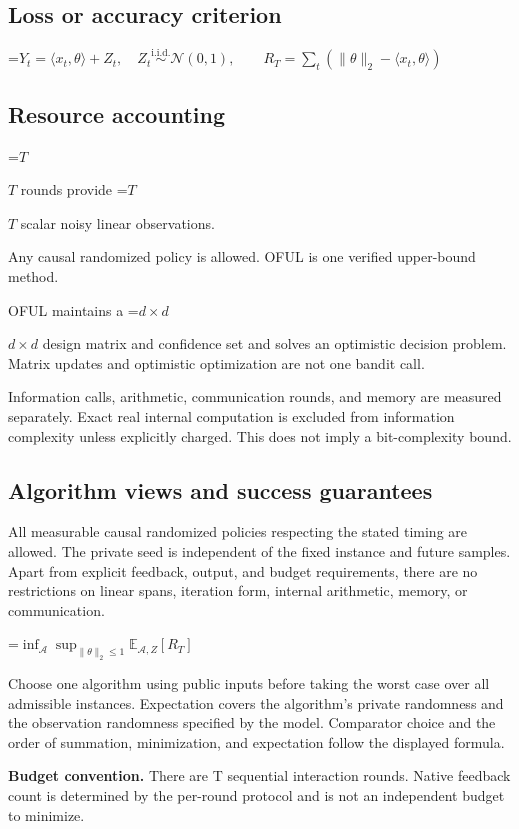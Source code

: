 \documentclass[10pt,a4paper]{article}
\newcommand{\AtlasMath}[1]{\par\begingroup\centering\setbox0=\hbox{$\displaystyle #1$}\ifdim\wd0>1.4\linewidth\typeout{ATLAS WIDE FORMULA: \the\wd0}\fi\ifdim\wd0>\linewidth\resizebox{\linewidth}{!}{\box0}\else\box0\fi\par\endgroup}
\newcommand{\AtlasInlineMath}[1]{\begingroup\setbox0=\hbox{$#1$}\ifdim\wd0>.4\linewidth\endgroup\AtlasMath{#1}\else\endgroup$#1$\fi}
\begin{document}
\subsection{Loss or accuracy criterion}

\AtlasMath{Y_t=\langle x_t,\theta\rangle+Z_t,\quad Z_t\overset{\mathrm{i.i.d.}}\sim\mathcal{N}(0,1),\qquad R_T=\sum_t(\|\theta\|_2-\langle x_t,\theta\rangle)}


\subsection{Resource accounting}
\AtlasInlineMath{T} rounds provide \AtlasInlineMath{T} scalar noisy linear observations.

Any causal randomized policy is allowed. OFUL is one verified upper-bound method.

OFUL maintains a \AtlasInlineMath{d\times d} design matrix and confidence set and solves an optimistic decision problem. Matrix updates and optimistic optimization are not one bandit call.

Information calls, arithmetic, communication rounds, and memory are measured separately. Exact real internal computation is excluded from information complexity unless explicitly charged. This does not imply a bit-complexity bound.

\subsection{Algorithm views and success guarantees}
All measurable causal randomized policies respecting the stated timing are allowed. The private seed is independent of the fixed instance and future samples. Apart from explicit feedback, output, and budget requirements, there are no restrictions on linear spans, iteration form, internal arithmetic, memory, or communication.


\AtlasMath{\inf_{\mathcal{A}}\sup_{\|\theta\|_2\le1}\mathbb{E}_{\mathcal{A},Z}[R_T]}


Choose one algorithm using public inputs before taking the worst case over all admissible instances. Expectation covers the algorithm's private randomness and the observation randomness specified by the model. Comparator choice and the order of summation, minimization, and expectation follow the displayed formula.

\textbf{Budget convention.} There are T sequential interaction rounds. Native feedback count is determined by the per-round protocol and is not an independent budget to minimize.
\end{document}
